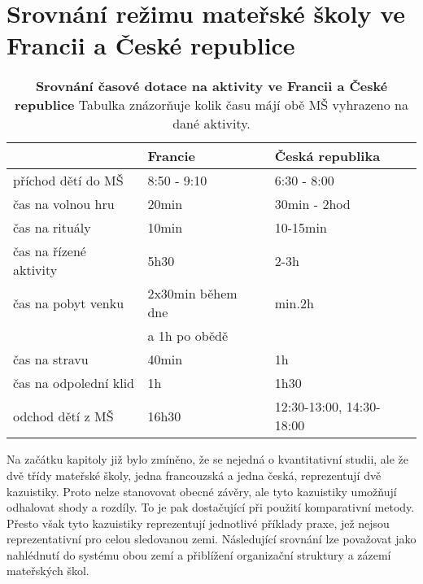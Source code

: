 \section{Srovnání režimu mateřské školy ve Francii a České republice} 
\label{srovnani} 

\begin{table}[h]
	
	\begin{tabular}{|l|l|l|}
	\hline
	\rowcolor{grey}
								& \textbf{Francie}				& \textbf{Česká republika}	\\
	\hline
	\hline
\rowcolor{grey!10}	 příchod dětí do MŠ			& 8:50 - 9:10				& 6:30 - 8:00			\\ 
\rowcolor{grey!50}	 čas na volnou hru 			& 20min 					&30min - 2hod 	\\ 
\rowcolor{grey!10}	 čas na rituály 			&10min 						&10-15min \\
\rowcolor{grey!50}	 čas na řízené aktivity		&5h30 						&2-3h   \\ 
\rowcolor{grey!10}	 čas na pobyt venku     	&2x30min během dne			&min.2h 	\\ 
\rowcolor{grey!10}								&a 1h po obědě				& \\ 
\rowcolor{grey!50}	 čas na stravu				&40min						&1h \\
\rowcolor{grey!10}	 čas na odpolední klid 	 	&1h 						&1h30 	\\
\rowcolor{grey!50}	 odchod dětí z MŠ			&16h30						&12:30-13:00, 14:30-18:00	\\														 
	 \hline
	  
	\end{tabular}
	
	\caption{ \textbf{Srovnání časové dotace na aktivity ve Francii a České republice} Tabulka znázorňuje kolik času májí obě MŠ vyhrazeno na dané aktivity.
	}
	\label{srovnanirezimdne}
\end{table}


	Na začátku kapitoly již bylo zmíněno, že se nejedná o kvantitativní studii, ale že dvě třídy mateřské školy, jedna francouzská a jedna česká, reprezentují dvě kazuistiky. Proto nelze stanovovat obecné závěry, ale tyto kazuistiky umožňují odhalovat shody a rozdíly. To je pak dostačující při použití komparativní metody. Přesto však tyto kazuistiky reprezentují jednotlivé příklady praxe, jež nejsou reprezentativní pro celou sledovanou zemi. Následující srovnání lze považovat jako nahlédnutí do systému obou zemí a přiblížení organizační struktury a zázemí mateřských škol.


